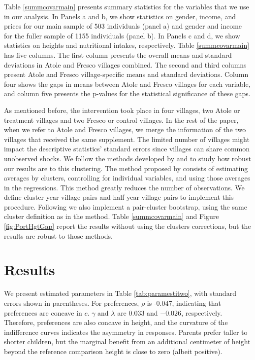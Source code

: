 Table \ref{summcovarmain} presents summary statistics for the variables that we use in our analysis. In Panels a and b, we show statistics on gender, income, and prices for our main sample of 503 individuals (panel a) and gender and income for the fuller sample of 1155 individuals (panel b). In Panels c and d, we show statistics on heights and nutritional intakes, respectively. Table \ref{summcovarmain} has five columns. The first column presents the overall means and standard deviations in Atole and Fresco villages combined. The second and third columns present Atole and Fresco village-specific means and standard deviations. Column four shows the gaps in means between Atole and Fresco villages for each variable, and column five presents the p-values for the statistical significance of these gaps.

As mentioned before, the intervention took place in four villages, two Atole or treatment villages and two Fresco or control villages. In the rest of the paper, when we refer to Atole and Fresco villages, we merge the information of the two villages that received the same supplement. The limited number of villages might impact the descriptive statistics' standard errors since villages can share common unobserved shocks. We follow the methods developed by \textcite{donald2007inference} and \textcite{cameron2015practitioner} to study how robust our results are to this clustering. The method proposed by \textcite{donald2007inference} consists of estimating averages by clusters, controlling for individual variables, and using those averages in the regressions. This method greatly reduces the number of observations. We define cluster year-village pairs and half-year-village pairs to implement this procedure. Following \textcite{cameron2015practitioner} we also implement a pair-cluster bootstrap, using the same cluster definition as in the \textcite{donald2007inference} method. Table \ref{summcovarmain} and Figure \ref{fig:PortHgtGap} report the results without using the clusters corrections, but the results are robust to those methods.

\section{Results}


We present estimated parameters in Table \ref{tab:paramestitwo}, with standard errors shown in parentheses. For preferences, $\rho$ is -0.047, indicating that preferences are concave in $c$. $\gamma$ and $\lambda$ are $0.033$ and $-0.026$, respectively. Therefore, preferences are also concave in height, and the curvature of the indifference curves indicates the asymmetry in responses. Parents prefer taller to shorter children, but the marginal benefit from an additional centimeter of height beyond the reference comparison height is close to zero (albeit positive).


